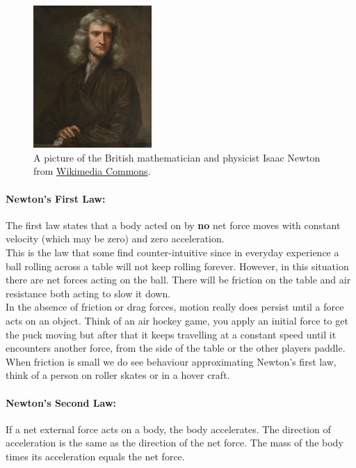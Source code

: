 \documentclass[a4paper,12pt]{book}
\begin{document}
\begin{figure}[ht]
    \centering
    \includegraphics[width=0.4\textwidth]{figures/Portrait_of_Sir_Isaac_Newton,_1689.jpg}
    \caption{A picture of the British mathematician and physicist Isaac Newton from \href{https://commons.wikimedia.org/wiki/File:Portrait_of_Sir_Isaac_Newton,_1689.jpg}{Wikimedia Commons}.}
\end{figure}

\paragraph{Newton's First Law:} The first law states that a body acted on by \textbf{no} net force moves with constant velocity (which may be zero) and zero acceleration. \\

This is the law that some find counter-intuitive since in everyday experience a ball rolling across a table will not keep rolling forever. However, in this situation there are net forces acting on the ball. There will be friction on the table and air resistance both acting to slow it down.\\

In the absence of friction or drag forces, motion really does persist until a force acts on an object. Think of an air hockey game, you apply an initial force to get the puck moving but after that it keeps travelling at a constant speed until it encounters another force, from the side of the table or the other players paddle. When friction is small we do see behaviour approximating Newton's first law, think of a person on roller skates or in a hover craft.

\paragraph{Newton's Second Law:} If a net external force acts on a body, the body accelerates. The direction of acceleration is the same as the direction of the net force. The mass of the body times its acceleration equals the net force.\\
\end{document}
